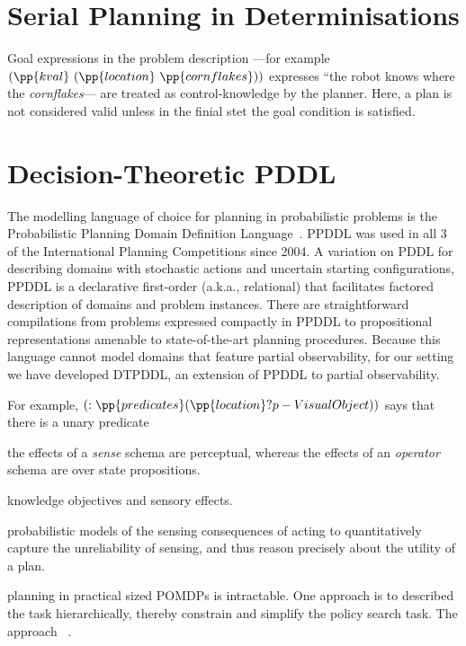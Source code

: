\documentclass[letterpaper]{article}
\begin{document}
\section{Serial Planning in Determinisations}

Goal expressions in the problem description ---for example
$(\pp{kval}~(\pp{location}~\pp{cornflakes}))$ expresses ``the robot
knows where the {\em cornflakes}--- are treated as control-knowledge
by the planner. Here, a plan is not considered valid unless in the
finial stet the goal condition is satisfied.


\section{Decision-Theoretic PDDL}

The modelling language of choice for planning in probabilistic
problems is the Probabilistic Planning Domain Definition
Language~\cite{younes:littman:04}. PPDDL was used in all 3 of the
International Planning Competitions since 2004. A variation on PDDL
for describing domains with stochastic actions and uncertain starting
configurations, PPDDL is a declarative first-order (a.k.a.,
relational) that facilitates factored description of domains and
problem instances. There are straightforward compilations from
problems expressed compactly in PPDDL to propositional representations
amenable to state-of-the-art planning procedures.  Because this
language cannot model domains that feature partial observability, for
our setting we have developed DTPDDL, an extension of PPDDL to partial
observability.

For example, $(:\pp{predicates} (\pp{location} ?p - VisualObject))$
says that there is a unary predicate 




the effects of a {\em sense} schema are perceptual, whereas the
effects of an {\em operator} schema are over state propositions.


knowledge objectives and  sensory effects. 


probabilistic models of the sensing consequences of acting to
quantitatively capture the unreliability of sensing, and thus reason
precisely about the utility of a plan. 


planning in practical sized POMDPs is intractable. One approach is to
described the task hierarchically, thereby constrain and simplify the
policy search task. The approach ~\cite{}. 
\end{document}
